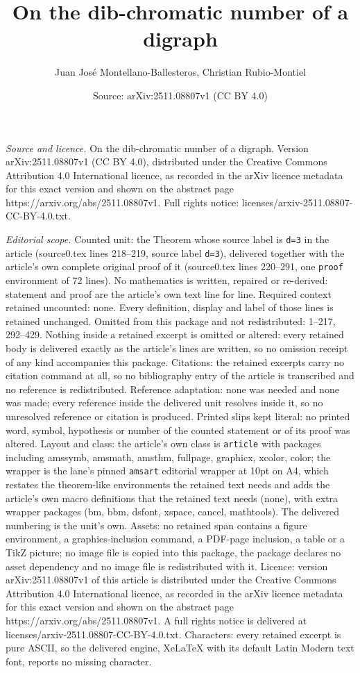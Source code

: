 \documentclass[10pt,a4paper]{amsart}
\title[On the dib-chromatic number of a digraph]{On the dib-chromatic number of a digraph}
\author{Juan Jos\'e Montellano-Ballesteros, Christian Rubio-Montiel}
\date{Source: arXiv:2511.08807v1 (CC BY 4.0)}
\begin{document}
\maketitle

\noindent\emph{Source and licence.} On the dib-chromatic number of a digraph. Version arXiv:2511.08807v1 (CC BY 4.0), distributed under the Creative Commons Attribution 4.0 International licence, as recorded in the arXiv licence metadata for this exact version and shown on the abstract page https://arxiv.org/abs/2511.08807v1. Full rights notice: licenses/arxiv-2511.08807-CC-BY-4.0.txt.\par\smallskip

\noindent\textit{Editorial scope.} Counted unit: the Theorem whose source label is \texttt{d=3} in the article (source0.tex lines 218--219, source label \texttt{d=3}), delivered together with the article's own complete original proof of it (source0.tex lines 220--291, one \texttt{proof} environment of 72 lines). No mathematics is written, repaired or re-derived: statement and proof are the article's own text line for line. Required context retained uncounted: none. Every definition, display and label of those lines is retained unchanged. Omitted from this package and not redistributed: 1--217, 292--429. Nothing inside a retained excerpt is omitted or altered: every retained body is delivered exactly as the article's lines are written, so no omission receipt of any kind accompanies this package. Citations: the retained excerpts carry no citation command at all, so no bibliography entry of the article is transcribed and no reference is redistributed. Reference adaptation: none was needed and none was made; every reference inside the delivered unit resolves inside it, so no unresolved reference or citation is produced. Printed slips kept literal: no printed word, symbol, hypothesis or number of the counted statement or of its proof was altered. Layout and class: the article's own class is \texttt{article} with packages including amssymb, amsmath, amsthm, fullpage, graphicx, xcolor, color; the wrapper is the lane's pinned \texttt{amsart} editorial wrapper at 10pt on A4, which restates the theorem-like environments the retained text needs and adds the article's own macro definitions that the retained text needs (none), with extra wrapper packages (bm, bbm, dsfont, xspace, cancel, mathtools). The delivered numbering is the unit's own. Assets: no retained span contains a figure environment, a graphics-inclusion command, a PDF-page inclusion, a table or a TikZ picture; no image file is copied into this package, the package declares no asset dependency and no image file is redistributed with it. Licence: version arXiv:2511.08807v1 of this article is distributed under the Creative Commons Attribution 4.0 International licence, as recorded in the arXiv licence metadata for this exact version and shown on the abstract page https://arxiv.org/abs/2511.08807v1. A full rights notice is delivered at licenses/arxiv-2511.08807-CC-BY-4.0.txt. Characters: every retained excerpt is pure ASCII, so the delivered engine, XeLaTeX with its default Latin Modern text font, reports no missing character.
\end{document}
